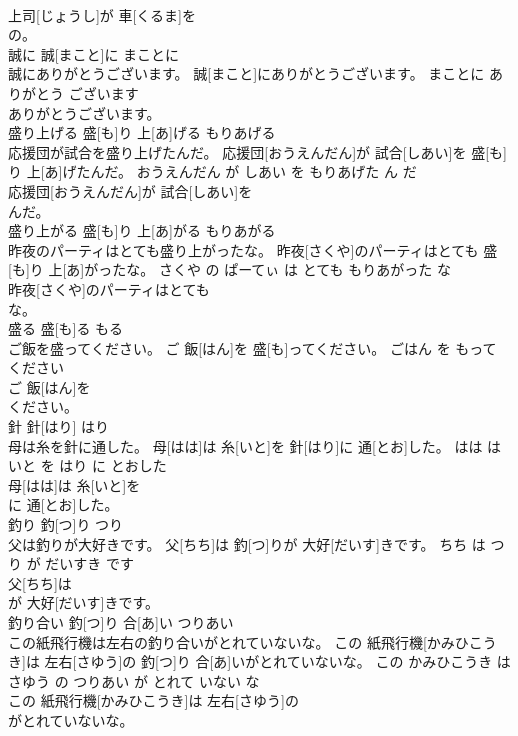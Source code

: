 \documentclass[8pt]{extreport}
\begin{document}
\begin{CJK}{UTF8}{min}
\\	上司[じょうし]が 車[くるま]を
\\	の。			
\\	誠に	誠[まこと]に	まことに	
\\	誠にありがとうございます。	誠[まこと]にありがとうございます。	まことに ありがとう ございます	
\\	ありがとうございます。			
\\	盛り上げる	盛[も]り 上[あ]げる	もりあげる	
\\	応援団が試合を盛り上げたんだ。	応援団[おうえんだん]が 試合[しあい]を 盛[も]り 上[あ]げたんだ。	おうえんだん が しあい を もりあげた ん だ	
\\	応援団[おうえんだん]が 試合[しあい]を
\\	んだ。			
\\	盛り上がる	盛[も]り 上[あ]がる	もりあがる	
\\	昨夜のパーティはとても盛り上がったな。	昨夜[さくや]のパーティはとても 盛[も]り 上[あ]がったな。	さくや の ぱーてぃ は とても もりあがった な	
\\	昨夜[さくや]のパーティはとても
\\	な。			
\\	盛る	盛[も]る	もる	
\\	ご飯を盛ってください。	ご 飯[はん]を 盛[も]ってください。	ごはん を もって ください	
\\	ご 飯[はん]を
\\	ください。			
\\	針	針[はり]	はり	
\\	母は糸を針に通した。	母[はは]は 糸[いと]を 針[はり]に 通[とお]した。	はは は いと を はり に とおした	
\\	母[はは]は 糸[いと]を
\\	に 通[とお]した。			
\\	釣り	釣[つ]り	つり	
\\	父は釣りが大好きです。	父[ちち]は 釣[つ]りが 大好[だいす]きです。	ちち は つり が だいすき です	
\\	父[ちち]は
\\	が 大好[だいす]きです。			
\\	釣り合い	釣[つ]り 合[あ]い	つりあい	
\\	この紙飛行機は左右の釣り合いがとれていないな。	この 紙飛行機[かみひこうき]は 左右[さゆう]の 釣[つ]り 合[あ]いがとれていないな。	この かみひこうき は さゆう の つりあい が とれて いない な	
\\	この 紙飛行機[かみひこうき]は 左右[さゆう]の
\\	がとれていないな。			

\end{CJK}
\end{document}
